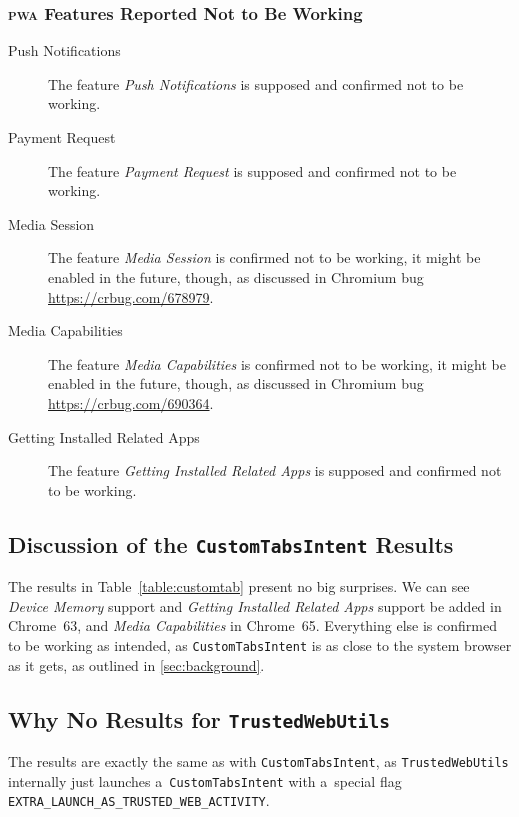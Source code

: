 \documentclass[sigconf]{acmart}
\begin{document}
\subsubsection{\textsc{pwa} Features Reported Not to Be Working}

\begin{description}
  \item[Push Notifications] The feature \emph{Push Notifications} is supposed and confirmed not to be working.
  \item[Payment Request] The feature \emph{Payment Request} is supposed and confirmed not to be working.
  \item[Media Session] The feature \emph{Media Session} is confirmed not to be working,
    it might be enabled in the future, though, as discussed in Chromium bug
    \url{https://crbug.com/678979}.
  \item[Media Capabilities] The feature \emph{Media Capabilities} is confirmed not to be working,
    it might be enabled in the future, though, as discussed in Chromium bug
    \url{https://crbug.com/690364}.
  \item[Getting Installed Related Apps] The feature \emph{Getting Installed Related Apps}
    is supposed and confirmed not to be working.
\end{description} 

\subsection{Discussion of the \texttt{CustomTabsIntent} Results}

The results in Table~\ref{table:customtab} present no big surprises. 
We can see \emph{Device Memory} support and \emph{Getting Installed Related Apps} support
be added in Chrome~63, and \emph{Media Capabilities} in Chrome~65.
Everything else is confirmed to be working as intended,
as \texttt{CustomTabsIntent} is as close to the system browser as it gets,
as outlined in \autoref{sec:background}.

\subsection{Why No Results for \texttt{TrustedWebUtils}}

The results are exactly the same as with \texttt{CustomTabsIntent},
as \texttt{TrustedWebUtils} internally just launches a~\texttt{CustomTabsIntent}
with a~special flag \texttt{EXTRA\_LAUNCH\_AS\_TRUSTED\_WEB\_ACTIVITY}.
\end{document}
